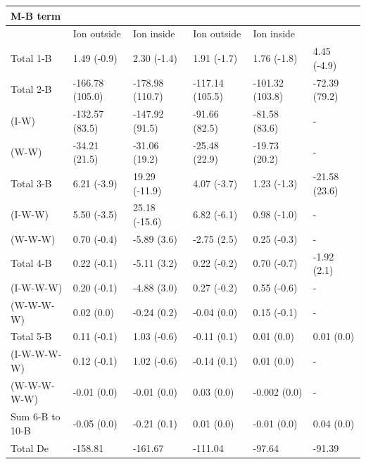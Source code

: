 \documentclass[11pt, proquest]{uwthesis}[2020/02/24]
\let\ce\ch
\begin{document}
\begin{table}[]
\begin{tabular}{@{}llllll@{}}
\toprule
\textbf{M-B term} & \multicolumn{2}{l}{\ce{Li^+(H2O)9}}     & \multicolumn{2}{l}{\ce{Cl^-(H2O)9}}     & \ce{(H2O)_{10}}       \\ \hline
                  & Ion outside     & Ion inside      & Ion outside     & Ion inside      &               \\ \hline
Total 1-B         & 1.49 (-0.9)     & 2.30 (-1.4)     & 1.91 (-1.7)     & 1.76 (-1.8)     & 4.45 (-4.9)   \\ \hline
Total 2-B         & -166.78 (105.0) & -178.98 (110.7) & -117.14 (105.5) & -101.32 (103.8) & -72.39 (79.2) \\
(I-W)             & -132.57 (83.5)  & -147.92 (91.5)  & -91.66 (82.5)   & -81.58 (83.6)   & -             \\
(W-W)             & -34.21 (21.5)   & -31.06 (19.2)   & -25.48 (22.9)   & -19.73 (20.2)   & -             \\ \hline
Total 3-B         & 6.21 (-3.9)     & 19.29 (-11.9)   & 4.07 (-3.7)     & 1.23 (-1.3)     & -21.58 (23.6) \\
(I-W-W)           & 5.50 (-3.5)     & 25.18 (-15.6)   & 6.82 (-6.1)     & 0.98 (-1.0)     & -             \\
(W-W-W)           & 0.70 (-0.4)     & -5.89 (3.6)     & -2.75 (2.5)     & 0.25 (-0.3)     & -             \\ \hline
Total 4-B         & 0.22 (-0.1)     & -5.11 (3.2)     & 0.22 (-0.2)     & 0.70 (-0.7)     & -1.92 (2.1)   \\
(I-W-W-W)         & 0.20 (-0.1)     & -4.88 (3.0)     & 0.27 (-0.2)     & 0.55 (-0.6)     & -             \\
(W-W-W-W)         & 0.02 (0.0)      & -0.24 (0.2)     & -0.04 (0.0)     & 0.15 (-0.1)     & -             \\ \hline
Total 5-B         & 0.11 (-0.1)     & 1.03 (-0.6)     & -0.11 (0.1)     & 0.01 (0.0)      & 0.01 (0.0)    \\
(I-W-W-W-W)       & 0.12 (-0.1)     & 1.02 (-0.6)     & -0.14 (0.1)     & 0.01 (0.0)      & -             \\
(W-W-W-W-W)       & -0.01 (0.0)     & -0.01 (0.0)     & 0.03 (0.0)      & -0.002 (0.0)    & -             \\ \hline
Sum 6-B to 10-B   & -0.05 (0.0)     & -0.21 (0.1)     & 0.01 (0.0)      & -0.01 (0.0)     & 0.04 (0.0)    \\ \hline
Total De          & -158.81         & -161.67         & -111.04         & -97.64          & -91.39       \\ \bottomrule

\end{tabular}
\end{table}
\end{document}
